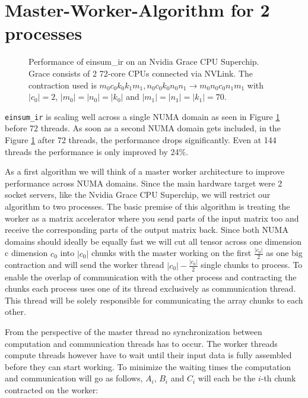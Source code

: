 

\section{Master-Worker-Algorithm for 2 processes}

\begin{figure}[ht]
  \caption{
    Performance of einsum\_ir on an Nvidia Grace CPU Superchip.
    Grace consists of 2 72-core CPUs connected via NVLink.
    The contraction used is $m_0c_0k_0k_1m_1, n_0c_0k_0n_0n_1 \rightarrow m_0n_0c_0n_1m_1$ with $|c_0|=2$, $|m_0|=|n_0|=|k_0|$ and $|m_1|=|n_1|=|k_1|=70$.
  }
  \label{fig:perf_threads}
\end{figure}

\texttt{einsum\_ir} is scaling well across a single NUMA domain as seen in Figure \ref{fig:perf_threads} before 72 threads.
As soon as a second NUMA domain gets included, in the Figure \ref{fig:perf_threads} after 72 threads, the performance drops significantly.
Even at 144 threads the performance is only improved by 24\%.

As a first algorithm we will think of a master worker architecture to improve performance across NUMA domains.
Since the main hardware target were 2 socket servers, like the Nvidia Grace CPU Superchip, we will restrict our algorithm to two processes.
The basic premise of this algorithm is treating the worker as a matrix accelerator where you send parts of the input matrix too and receive the corresponding parts of the output matrix back.
Since both NUMA domains should ideally be equally fast we will cut all tensor across one dimension c dimension $c_0$ into $|c_0|$ chunks with the master working on the first $\frac{|c_0|}{2}$ as one big contraction and will send the worker thread $|c_0|-\frac{|c_0|}{2}$ single chunks to process.
To enable the overlap of communication with the other process and contracting the chunks each process uses one of its thread exclusively as communication thread.
This thread will be solely responsible for communicating the array chunks to each other.

From the perspective of the master thread no synchronization between computation and communication threads has to occur.
The worker threads compute threads however have to wait until their input data is fully assembled before they can start working.
To minimize the waiting times the computation and communication will go as follows, $A_i$, $B_i$ and $C_i$ will each be the $i$-th chunk contracted on the worker:


